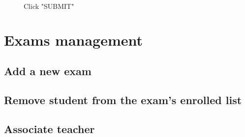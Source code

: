 \documentclass[ManualeUtente]{subfiles}
\begin{document}
\begin{enumerate}
	\begin{figure}[H]
		\centering
		\caption{Click "SUBMIT"}
		\label{fig:Click "SUBMIT"}
	\end{figure}
\end{enumerate}

\section{Exams management}
\subsection{Add a new exam}
\subsection{Remove student from the exam's enrolled list}
\subsection{Associate teacher}
\end{document}
